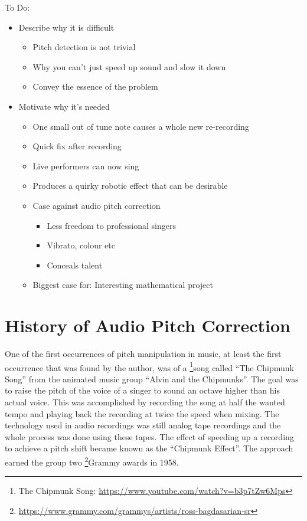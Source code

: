 \color{red}
To Do:
\begin{itemize}
	\item Describe why it is difficult
	\begin{itemize}
		\item Pitch detection is not trivial
		\item Why you can't just speed up sound and slow it down
		\item Convey the essence of the problem
	\end{itemize}
		\item Motivate why it's needed
		\begin{itemize}
		\item One small out of tune note causes a whole new re-recording
		\item Quick fix after recording
		\item Live performers can now sing
		\item Produces a quirky robotic effect that can be desirable
		\item Case against audio pitch correction
		\begin{itemize}
			\item Less freedom to professional singers
			\item Vibrato, colour etc
			\item Conceals talent
		\end{itemize}
		\item Biggest case for: Interesting mathematical project
	\end{itemize}
\end{itemize}
\color{black}

\section{History of Audio Pitch Correction}

One of the first occurrences of pitch manipulation in music, at least the first
occurrence that was found by the author, was of a \footnote{The Chipmunk Song:
\url{https://www.youtube.com/watch?v=b3p7tZw6Mps}}song called ``The Chipmunk
Song'' from the animated music group ``Alvin and the Chipmunks''. The goal was to
raise the pitch of the voice of a singer to sound an octave higher than his actual
voice. This was accomplished by recording the song at half the wanted tempo and
playing back the recording at twice the speed when mixing. The technology used in
audio recordings was still analog tape recordings and the whole process was done
using these tapes. The effect of speeding up a recording to achieve a pitch shift
became known as the ``Chipmunk Effect''. The approach earned the group two
\footnote{\url{https://www.grammy.com/grammys/artists/ross-bagdasarian-sr}}Grammy
awards in 1958.

